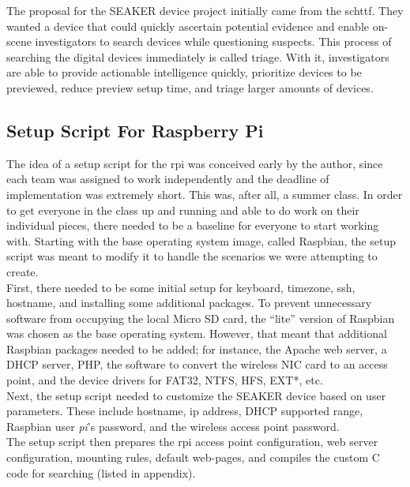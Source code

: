 \documentclass[12pt]{article}
\begin{document}
The proposal for the SEAKER device project initially came from the \gls{schttf}.  They wanted
a device that could quickly ascertain potential evidence and enable on-scene investigators
to search devices while questioning suspects.  This process of searching the digital devices
immediately is called triage.  With it, investigators are able to provide actionable
intelligence quickly, prioritize devices to be previewed, reduce preview setup time, and
triage larger amounts of devices.\\

\subsection{Setup Script For Raspberry Pi}

The idea of a setup script for the \gls{rpi} was conceived early by the author, since
each team was assigned to work independently and the deadline of implementation was
extremely short.  This was, after all, a summer class.  In order to get everyone in
the class up and running and able to do work on their individual pieces, there
needed to be a baseline for everyone to start working with.  Starting with the 
base operating system image, called Raspbian, the setup script was meant to modify
it to handle the scenarios we were attempting to create.\\

First, there needed to be some initial setup for keyboard, timezone, \gls{ssh}, hostname,
and installing some additional packages.  To prevent unnecessary 
software from occupying the local Micro SD card, the ``lite'' version of Raspbian
was chosen as the base operating system.  However, that meant that additional
Raspbian packages needed to be added; for instance, the Apache web server, a DHCP
server, PHP, the software to convert the wireless NIC card to an access point, and
the device drivers for FAT32, NTFS, HFS, EXT*, etc.\\

Next, the setup script needed to customize the SEAKER device based on user
parameters.  These include hostname, \gls{ip} address, DHCP supported range, Raspbian
user {\em pi}'s password, and the wireless access point password.\\

The setup script then prepares the \gls{rpi} access point configuration, web server
configuration, mounting rules, default web-pages, and compiles the custom C code
for searching (listed in appendix).\\
\end{document}
